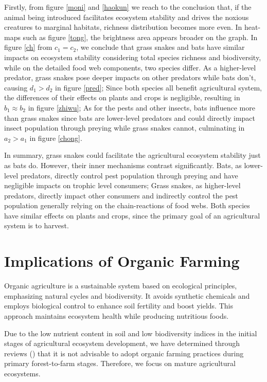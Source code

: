 \documentclass[12pt]{article}
\begin{document}
Firstly, from figure \ref{moni} and \ref{haokun} we reach to the conclusion that, if the animal being introduced facilitates ecosystem stability and drives the noxious creatures to marginal habitats, richness distribution becomes more even. In heat-maps such as figure \ref{tong}, the brightness area appears broader on the graph. In figure \ref{ch} from  $c_1=c_2$, we conclude that grass snakes and bats have similar impacts on ecosystem stability considering total species richness and biodiversity, while on the detailed food web components, two species differ. As a higher-level predator, grass snakes pose deeper impacts on other predators while bats don't, causing $d_1>d_2$ in figure \ref{pred}; Since both species all benefit agricultural system, the differences of their effects on plants and crops is negligible, resulting in $b_1\approx b_2$ in figure \ref{zhiwu}; As for the pests and other insects, bats influence more than grass snakes since bats are lower-level predators and could directly impact insect population through preying while grass snakes cannot, culminating in $a_2>a_1$ in figure \ref{chong}. 

In summary, grass snakes could facilitate the agricultural ecosystem stability just as bats do. However, their inner mechanisms contrast significantly. Bats, as lower-level predators, directly control pest population through preying  and have negligible impacts on trophic level consumers; Grass snakes, as higher-level predators, directly impact other consumers and indirectly control the pest population generally relying on the chain-reactions of food webs. Both species have similar effects on plants and crops, since the primary goal of an agricultural system is to harvest.

\section{Implications of Organic Farming}
\hspace{1.5em}Organic agriculture is a sustainable system based on ecological principles, emphasizing natural cycles and biodiversity. It avoids synthetic chemicals and employs biological control to enhance soil fertility and boost yields. This approach maintains ecosystem health while producing nutritious foods.

Due to the low nutrient content in soil and low biodiversity indices in the initial stages of agricultural ecosystem development, we have determined through reviews (\cite{8}) that it is not advisable to adopt organic farming practices during primary forest-to-farm stages. Therefore, we focus on mature agricultural ecosystems.
\end{document}
